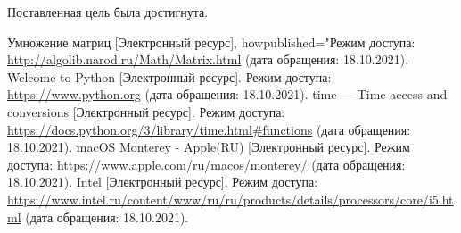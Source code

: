 \documentclass[a4paper,14pt, unknownkeysallowed]{extreport}
\begin{document}
Поставленная цель была достигнута.


\begin{thebibliography}{5}
	Умножение матриц [Электронный ресурс],
	howpublished="Режим доступа: \url{http://algolib.narod.ru/Math/Matrix.html} (дата обращения: 18.10.2021).
	Welcome to Python [Электронный ресурс]. Режим доступа: \url{https://www.python.org} (дата обращения: 18.10.2021).
	time — Time access and conversions [Электронный ресурс]. Режим доступа: \url{https://docs.python.org/3/library/time.html#functions} (дата обращения: 18.10.2021).
	macOS Monterey - Apple(RU) [Электронный ресурс]. Режим доступа: \url{https://www.apple.com/ru/macos/monterey/} (дата обращения: 18.10.2021).
	Intel [Электронный ресурс]. Режим доступа: \url{https://www.intel.ru/content/www/ru/ru/products/details/processors/core/i5.html} (дата обращения: 18.10.2021).
\end{thebibliography}

\end{document}

